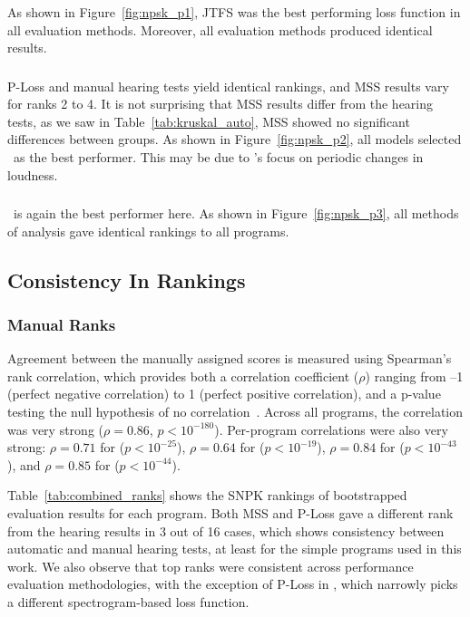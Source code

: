 \subsubsection{\AddSineSaw}
As shown in Figure~\ref{fig:npsk_p1}, JTFS was the best performing loss function in all evaluation methods. Moreover, all evaluation methods produced identical results. 

\subsubsection{\AmpMod}
P-Loss and manual hearing tests yield identical rankings, and MSS results vary for ranks 2 to 4. It is not surprising that MSS results differ from the hearing tests, as we saw in Table~\ref{tab:kruskal_auto}, MSS showed no significant differences between groups. As shown in Figure~\ref{fig:npsk_p2}, all models selected \DTWEnv~as the best performer. This may be due to \DTWEnv's focus on periodic changes in loudness.

\subsubsection{\FMMod}
\DTWEnv~is again the best performer here. As shown in Figure~\ref{fig:npsk_p3}, all methods of analysis gave identical rankings to all programs.


\subsection{Consistency In Rankings}
\label{sec:consistency_in_rankings}
\subsubsection{Manual Ranks} Agreement between the manually assigned scores is measured using Spearman’s rank correlation, which provides both a correlation coefficient ($\rho$) ranging from –1 (perfect negative correlation) to 1 (perfect positive correlation), and a p-value testing the null hypothesis of no correlation~\cite{spearman1987proof,rebekic2015pearson}. Across all programs, the correlation was very strong ($\rho = 0.86$, $p < 10^{-180}$). Per-program correlations were also very strong: $\rho = 0.71$ for \BPNoise{} ($p < 10^{-25}$), $\rho = 0.64$ for \AddSineSaw{} ($p < 10^{-19}$), $\rho = 0.84$ for \AmpMod{} ($p < 10^{-43}$), and $\rho = 0.85$ for \FMMod{} ($p < 10^{-44}$). 

Table~\ref{tab:combined_ranks} shows the SNPK rankings of bootstrapped evaluation results for each program. Both MSS and P-Loss gave a different rank from the hearing results in 3 out of 16 cases, which shows consistency between automatic and manual hearing tests, at least for the simple programs used in this work. We also observe that top ranks were consistent across performance evaluation methodologies, with the exception of P-Loss in \BPNoise, which narrowly picks a different spectrogram-based loss function.
% 


